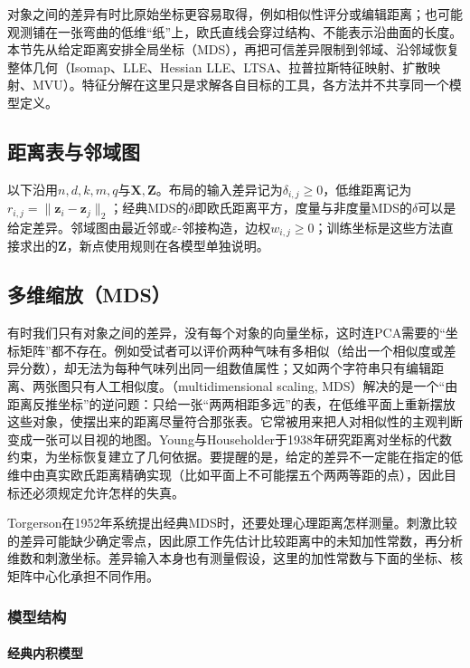 对象之间的差异有时比原始坐标更容易取得，例如相似性评分或编辑距离；也可能观测铺在一张弯曲的低维“纸”上，欧氏直线会穿过结构、不能表示沿曲面的长度。本节先从给定距离安排全局坐标（MDS），再把可信差异限制到邻域、沿邻域恢复整体几何（Isomap、LLE、Hessian LLE、LTSA、拉普拉斯特征映射、扩散映射、MVU）。特征分解在这里只是求解各自目标的工具，各方法并不共享同一个模型定义。

\subsection{距离表与邻域图}
\label{sec:dim-common-notation}

以下沿用$n,d,k,m,q$与$\bm{X},\bm{Z}$。布局的输入差异记为$\delta_{i,j}\geq0$，低维距离记为$r_{i,j}=\lVert\bm{z}_i-\bm{z}_j\rVert_2$；经典MDS的$\delta$即欧氏距离平方，度量与非度量MDS的$\delta$可以是给定差异。邻域图由最近邻或$\varepsilon$-邻接构造，边权$w_{i,j}\geq0$；训练坐标是这些方法直接求出的$\bm{Z}$，新点使用规则在各模型单独说明。

\subsection{多维缩放（MDS）}
\label{sec:dim-mds}

有时我们只有对象之间的差异，没有每个对象的向量坐标，这时连PCA需要的“坐标矩阵”都不存在。例如受试者可以评价两种气味有多相似（给出一个相似度或差异分数），却无法为每种气味列出同一组数值属性；又如两个字符串只有编辑距离、两张图只有人工相似度。（multidimensional scaling, MDS）解决的是一个“由距离反推坐标”的逆问题：只给一张“两两相距多远”的表，在低维平面上重新摆放这些对象，使摆出来的距离尽量符合那张表。它常被用来把人对相似性的主观判断变成一张可以目视的地图。Young与Householder于1938年研究距离对坐标的代数约束，为坐标恢复建立了几何依据。要提醒的是，给定的差异不一定能在指定的低维中由真实欧氏距离精确实现（比如平面上不可能摆五个两两等距的点），因此目标还必须规定允许怎样的失真。

Torgerson在1952年系统提出经典MDS时，还要处理心理距离怎样测量。刺激比较的差异可能缺少确定零点，因此原工作先估计比较距离中的未知加性常数，再分析维数和刺激坐标。差异输入本身也有测量假设，这里的加性常数与下面的坐标、核矩阵中心化承担不同作用。

\subsubsection{模型结构}

\paragraph{经典内积模型}

